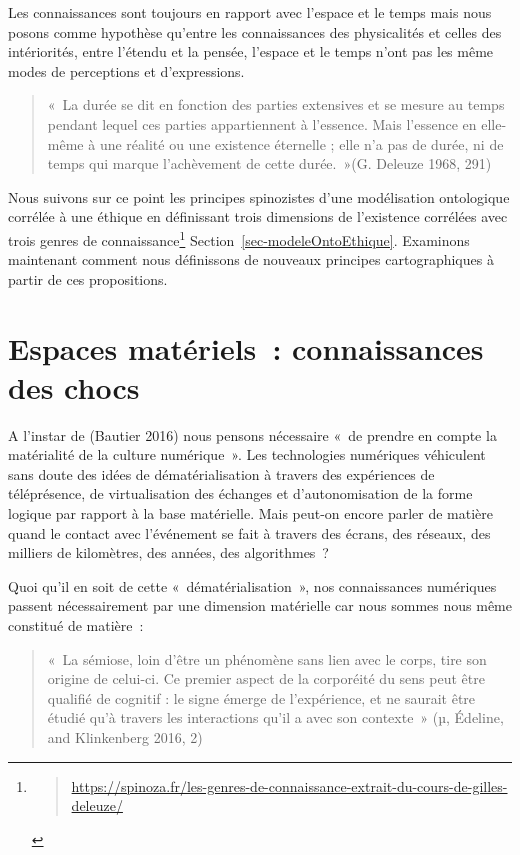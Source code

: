\documentclass[
  letterpaper,
  DIV=11,
  numbers=noendperiod]{scrreprt}
\begin{document}
Les connaissances sont toujours en rapport avec l'espace et le temps
mais nous posons comme hypothèse qu'entre les connaissances des
physicalités et celles des intériorités, entre l'étendu et la pensée,
l'espace et le temps n'ont pas les même modes de perceptions et
d'expressions.

\begin{quote}
«~La durée se dit en fonction des parties extensives et se mesure au
temps pendant lequel ces parties appartiennent à l'essence. Mais
l'essence en elle-même à une réalité ou une existence éternelle ; elle
n'a pas de durée, ni de temps qui marque l'achèvement de cette
durée.~»(G. Deleuze 1968, 291)
\end{quote}

Nous suivons sur ce point les principes spinozistes d'une modélisation
ontologique corrélée à une éthique en définissant trois dimensions de
l'existence corrélées avec trois genres de connaissance\footnote{\begin{quote}
  \url{https://spinoza.fr/les-genres-de-connaissance-extrait-du-cours-de-gilles-deleuze/}
  \end{quote}} Section~\ref{sec-modeleOntoEthique}. Examinons maintenant
comment nous définissons de nouveaux principes cartographiques à partir
de ces propositions.

\hypertarget{sec-espaceMateriels}{%
\section{Espaces matériels~: connaissances des
chocs}\label{sec-espaceMateriels}}

A l'instar de (Bautier 2016) nous pensons nécessaire «~de prendre en
compte la matérialité de la culture numérique~». Les technologies
numériques véhiculent sans doute des idées de dématérialisation à
travers des expériences de téléprésence, de virtualisation des échanges
et d'autonomisation de la forme logique par rapport à la base
matérielle. Mais peut-on encore parler de matière quand le contact avec
l'événement se fait à travers des écrans, des réseaux, des milliers de
kilomètres, des années, des algorithmes~?

Quoi qu'il en soit de cette «~dématérialisation~», nos connaissances
numériques passent nécessairement par une dimension matérielle car nous
sommes nous même constitué de matière~:

\begin{quote}
«~La sémiose, loin d'être un phénomène sans lien avec le corps, tire son
origine de celui-ci. Ce premier aspect de la corporéité du sens peut
être qualifié de cognitif : le signe émerge de l'expérience, et ne
saurait être étudié qu'à travers les interactions qu'il a avec son
contexte~» (µ, Édeline, and Klinkenberg 2016, 2)
\end{quote}
\end{document}
